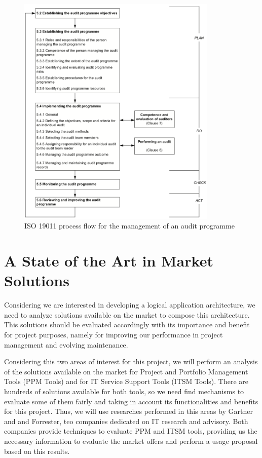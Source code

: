 \begin{figure}[t!]
\centering
\includegraphics[width=0.85\textwidth]{img/ISO19011AuditProcess.png}
\caption{ISO 19011 process flow for the management of an audit programme}
\end{figure}


\section{A State of the Art in Market Solutions}

Considering we are interested in developing a logical application architecture, we need to analyze solutions available on the market to compose this architecture. This solutions should be evaluated accordingly with its importance and benefit for project purposes, namely for improving our performance in project management and evolving maintenance.\par
Considering this two areas of interest for this project, we will perform an analysis of the solutions available on the market for Project and Portfolio Management Tools (PPM Tools) and for IT Service Support Tools (ITSM Tools). There are hundreds of solutions available for both tools, so we need find mechanisms to evaluate some of them fairly and taking in account its functionalities and benefits for this project. Thus, we will use researches performed in this areas by Gartner and and Forrester, teo companies dedicated on IT research and advisory. Both companies provide techniques to evaluate PPM and ITSM tools, providing us the necessary information to evaluate the market offers and perform a usage proposal based on this results.\par

